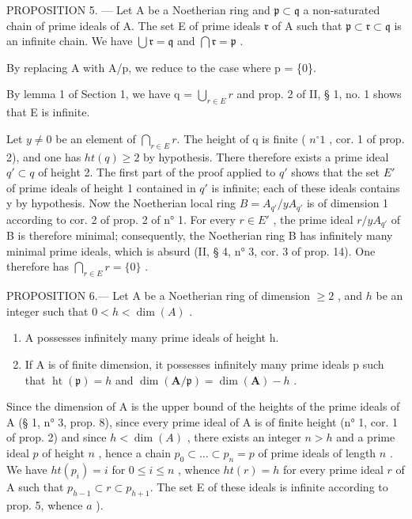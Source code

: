 PROPOSITION 5. --- Let A be a Noetherian ring and \(\mathfrak{p} \subset \mathfrak{q}\) a non-saturated chain of prime ideals of A. The set E of prime ideals \(\mathfrak{r}\) of A such that \(\mathfrak{p} \subset \mathfrak{r} \subset \mathfrak{q}\) is an infinite chain. We have \(\bigcup \mathfrak{r} = \mathfrak{q}\) and \(\bigcap \mathfrak{r} = \mathfrak{p}\) .

By replacing A with A/p, we reduce to the case where p = \{0\}.

By lemma 1 of Section 1, we have q = \(\bigcup_{r \in E} r\) and prop. 2 of II, § 1, no. 1 shows that E is infinite.

Let \(y \neq 0\) be an element of \(\bigcap_{r \in E} r\). The height of q is finite ( \(n^{\circ}1\) , cor. 1 of prop. 2), and one has \(ht(q) \geqslant 2\) by hypothesis. There therefore exists a prime ideal \(q' \subset q\) of height 2. The first part of the proof applied to \(q'\) shows that the set \(E'\) of prime ideals of height 1 contained in \(q'\) is infinite; each of these ideals contains y by hypothesis. Now the Noetherian local ring \(B = A_{q'} / yA_{q'}\) is of dimension 1 according to cor. 2 of prop. 2 of n° 1. For every \(r \in E'\) , the prime ideal \(r/yA_{q'}\) of B is therefore minimal; consequently, the Noetherian ring B has infinitely many minimal prime ideals, which is absurd (II, § 4, n° 3, cor. 3 of prop. 14). One therefore has \(\bigcap_{r \in E} r = \{0\}\) .

PROPOSITION 6.--- Let A be a Noetherian ring of dimension \(\geqslant 2\) , and \(h\) be an integer such that \(0 < h < \dim(A)\) .

\begin{enumerate}
\def\labelenumi{\alph{enumi})}
\item
  A possesses infinitely many prime ideals of height h.
\item
  If A is of finite dimension, it possesses infinitely many prime ideals p such that \(\operatorname{ht}(\mathfrak{p}) = h\) and \(\dim(\mathbf{A}/\mathfrak{p}) = \dim(\mathbf{A}) - h\) .
\end{enumerate}

Since the dimension of A is the upper bound of the heights of the prime ideals of A (§ 1, n° 3, prop. 8), since every prime ideal of A is of finite height (n° 1, cor. 1 of prop. 2) and since \(h < \dim(A)\) , there exists an integer \(n > h\) and a prime ideal \(p\) of height \(n\) , hence a chain \(p_0 \subset \ldots \subset p_n = p\) of prime ideals of length \(n\) . We have \(ht(p_i) = i\) for \(0 \leqslant i \leqslant n\) , whence \(ht(r) = h\) for every prime ideal \(r\) of A such that \(p_{h-1} \subset r \subset p_{h+1}\). The set E of these ideals is infinite according to prop. 5, whence \(a\) ).

